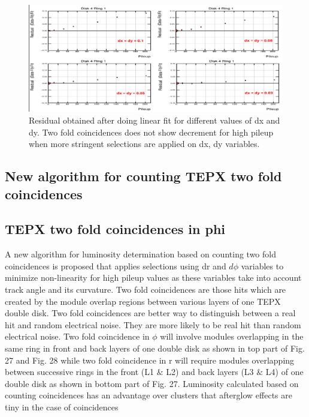 \begin{figure}[!htp]
\centering
\includegraphics[width=1\textwidth]{ashish_thesis/cut_optimization_residual.png}
\caption{%
  Residual obtained after doing linear fit for different values of dx and dy. Two fold coincidences does not show decrement for high pileup when more stringent selections are applied on dx, dy variables.
}
\label{fig:res_dxdycut}
\end{figure}


\subsection{New algorithm for counting TEPX two fold coincidences}

\subsection{TEPX two fold coincidences in phi}

A new algorithm for luminosity determination based on counting two fold coincidences is proposed that applies selections using dr and $d\phi$ variables to minimize non-linearity for high pileup values as these variables take into account track angle and its curvature. Two fold coincidences are those hits which are created by the module overlap regions between various layers of one TEPX double disk. Two fold coincidences are better way to distinguish between a real hit and random electrical noise. They are more likely to be real hit than random electrical noise. Two fold coincidence in $\phi$ will involve modules overlapping in the same ring in front and back layers of one double disk as shown in top part of Fig. 27 and Fig. 28 while two fold coincidence in r will require modules overlapping between successive rings in the front (L1 $\&$ L2) and back layers (L3 $\&$ L4) of one double disk as shown in bottom part of Fig. 27. Luminosity calculated based on counting coincidences has an advantage over clusters that afterglow effects are tiny in the case of coincidences  %

